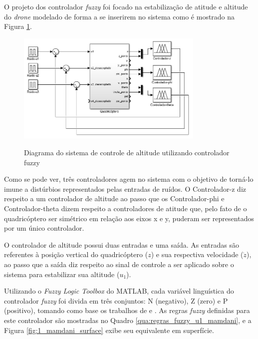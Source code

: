 O projeto dos controlador \textit{fuzzy} foi focado na estabilização de atitude e altitude do \textit{drone} modelado de forma a se inserirem no sistema como é mostrado na Figura \ref{fig:diagrama_sistema_controlado}.

\begin{figure}[!htb]
    \centering
    \caption{Diagrama do sistema de controle de altitude utilizando controlador fuzzy}
    \includegraphics[width=0.8\textwidth]{./04-figuras/figuras_pos_banca/2-sistema_completo_controlado/diagrama_sistema_controlado}
    \label{fig:diagrama_sistema_controlado}
\end{figure}

Como se pode ver, três controladores agem no sistema com o objetivo de torná-lo imune a distúrbios representados pelas entradas de ruídos. O {\ttfamily Controlador-z} diz respeito a um controlador de altitude ao passo que os {\ttfamily Controlador-phi} e {\ttfamily Controlador-theta} dizem respeito a controladores de atitude que, pelo fato de o quadricóptero ser simétrico em relação aos eixos x e y, puderam ser representados por um único controlador.

O controlador de altitude possui duas entradas e uma saída. As entradas são referentes à posição vertical do quadricóptero ($z$) e sua respectiva velocidade ($\dot{z}$), ao passo que a saída diz respeito ao sinal de controle a ser aplicado sobre o sistema para estabilizar sua altitude ($u_1$).

Utilizando o \textit{Fuzzy Logic Toolbox} do MATLAB, cada variável linguística do controlador \textit{fuzzy} foi divida em três conjuntos: N (negativo), Z (zero) e P (positivo), tomando como base os trabalhos de  e . As regras \textit{fuzzy} definidas para este controlador são mostradas no Quadro \ref{qua:regras_fuzzy_u1_mamdani}, e a Figura \ref{fig:1_mamdani_surface} exibe seu equivalente em superfície.

